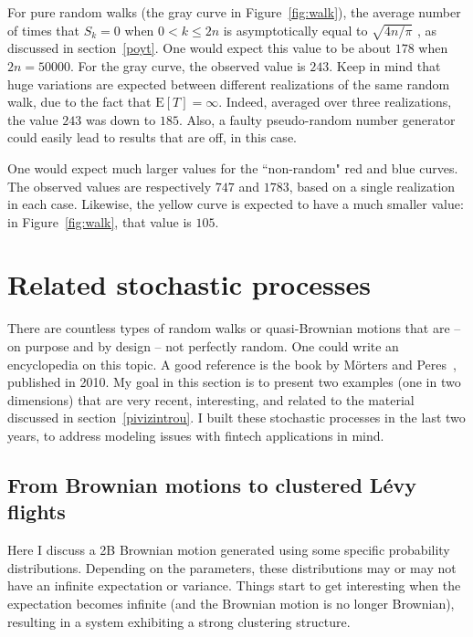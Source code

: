 \documentclass[oneside,10pt]{book}
\begin{document}
For pure random walks (the gray curve in Figure~\ref{fig:walk}), the average number of times that $S_k=0$ when $0<k\leq 2n$
 is asymptotically equal to $\sqrt{4n/\pi}$ , as discussed in section~\ref{poyt}. One would expect this value to be about $178$
 when $2n=\num{50000}$. For the gray curve, the observed value is $243$. Keep in mind that huge variations are expected between different realizations of the same random walk, due to the fact that $\text{E}[T]=\infty$. Indeed, averaged over three realizations, the value $243$ was down to
$185$. Also, a faulty pseudo-random number generator could easily lead to results that are off, in this case.

One would expect much larger
 values for the ``non-random" red and blue curves. The observed
values are respectively $747$ and $1783$, based on a single realization in each case. Likewise, the yellow curve is expected to have a much smaller value: in Figure~\ref{fig:walk},
that value is $105$.


\section{Related stochastic processes}

There are countless types of random walks or quasi-Brownian motions that are -- on purpose and by design -- not perfectly random. One could write an encyclopedia on
 this topic. A good reference is the book by Mörters and Peres~\cite{peresbrown}, published in 2010.
My goal in this section is to present two examples (one in two dimensions) that are very recent, interesting, and related to the material
 discussed in section~\ref{pivizintrou}. I built these stochastic processes in the last two years, to address modeling issues with fintech applications in mind.



\subsection{From Brownian motions to clustered Lévy flights}\label{lvfgf}

Here I discuss a 2B Brownian motion generated using some specific probability distributions. Depending on the parameters, these distributions may or may not have an infinite expectation or variance. Things start to get interesting when the expectation becomes infinite (and the Brownian motion is no
 longer Brownian), resulting in a system exhibiting a strong clustering structure.
\end{document}
